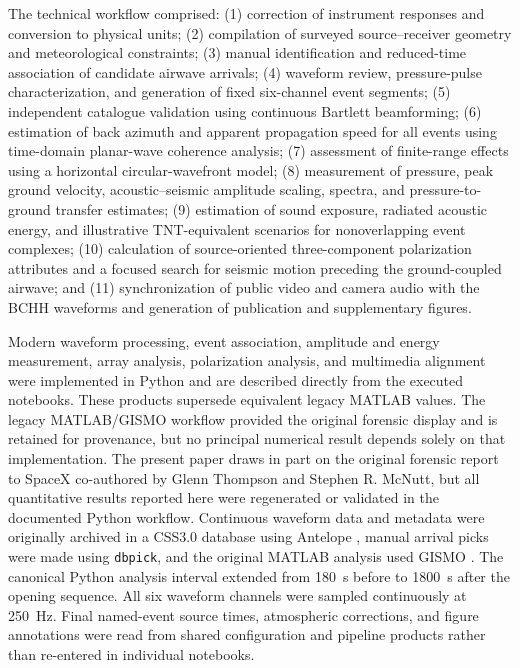 \documentclass[]{seismica}
\begin{document}
The technical workflow comprised:
(1) correction of instrument responses and conversion to physical units;
(2) compilation of surveyed source--receiver geometry and meteorological
constraints;
(3) manual identification and reduced-time association of candidate airwave
arrivals;
(4) waveform review, pressure-pulse characterization, and generation of fixed
six-channel event segments;
(5) independent catalogue validation using continuous Bartlett beamforming;
(6) estimation of back azimuth and apparent propagation speed for all events
using time-domain planar-wave coherence analysis;
(7) assessment of finite-range effects using a horizontal circular-wavefront
model;
(8) measurement of pressure, peak ground velocity, acoustic--seismic amplitude
scaling, spectra, and pressure-to-ground transfer estimates;
(9) estimation of sound exposure, radiated acoustic energy, and illustrative
TNT-equivalent scenarios for nonoverlapping event complexes;
(10) calculation of source-oriented three-component polarization attributes
and a focused search for seismic motion preceding the ground-coupled airwave;
and (11) synchronization of public video and camera audio with the BCHH
waveforms and generation of publication and supplementary figures.

Modern waveform processing, event association, amplitude and energy
measurement, array analysis, polarization analysis, and multimedia alignment
were implemented in Python and are described directly from the executed
notebooks. These products supersede equivalent legacy MATLAB values. The
legacy MATLAB/GISMO workflow provided the original forensic display and is
retained for provenance, but no principal numerical result depends solely on
that implementation. The present paper draws in part on the original forensic
report to SpaceX co-authored by Glenn Thompson and Stephen R. McNutt, but all
quantitative results reported here were regenerated or validated in the
documented Python workflow. Continuous waveform data and
metadata were originally archived in a CSS3.0 database using Antelope
\citep{brtt_antelope}, manual arrival picks were made using
\texttt{dbpick}, and the original MATLAB analysis used GISMO
\citep{thompson_gismo_2017}. The canonical Python analysis interval extended from 180~s
before to 1800~s after the opening sequence. All six waveform channels were
sampled continuously at 250~Hz. Final named-event source times, atmospheric
corrections, and figure annotations were read from shared configuration and
pipeline products rather than re-entered in individual notebooks.
\end{document}
